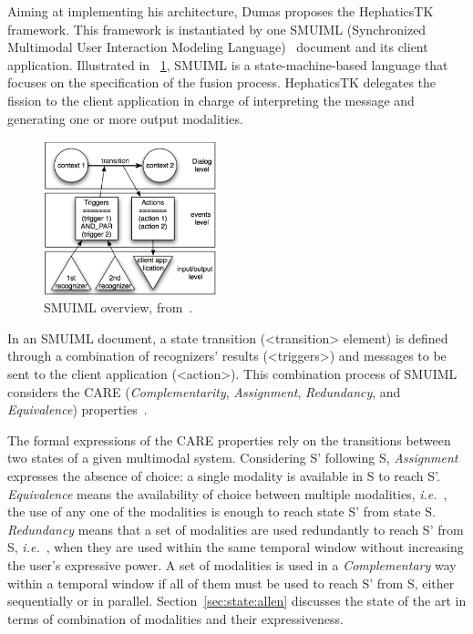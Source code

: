 \documentclass[
  doutorado,
  american
]{ThesisPUC}
\newcommand{\fig}[1]{\figurename~\ref{#1}}
\newcommand{\sect}[1]{Section~\ref{#1}}
\newcommand{\captionvspace}{\vspace{-1.3em}}
\begin{document}
Aiming at implementing his architecture, Dumas proposes the HephaticsTK 
framework. This framework is instantiated by one SMUIML (Synchronized 
Multimodal User Interaction Modeling Language)~\cite{dumas_description_2010} document and its client 
application. Illustrated in \fig{fig:smuiml}, SMUIML is a state-machine-based 
language 
that focuses on the specification of the fusion process. HephaticsTK delegates 
the fission to the client application in charge of interpreting the message and 
generating one or more output modalities. 

\begin{figure}[!ht]
\begin{center}
	\includegraphics[width=5cm, keepaspectratio]{img/img8.png}
	\caption[SMUIML overview]{SMUIML overview, from~\cite{dumas_prototyping_2008}.}
	\label{fig:smuiml}
    \captionvspace
\end{center}
\end{figure}

In an SMUIML document, a state transition (<transition> element) is defined
through a combination of recognizers’ results (<triggers>) and messages to be
sent to the client application (<action>). This combination process of SMUIML
considers the CARE (\textit{Complementarity}, \textit{Assignment}, 
\textit{Redundancy}, and \textit{Equivalence}) properties~\cite{coutaz_four_1995}. 

The formal expressions of the CARE properties rely on the transitions between
two states of a given multimodal system. Considering S’ following S, 
\textit{Assignment} expresses the absence of choice: a single modality is
available in S to reach S’. \textit{Equivalence} means the availability of
choice between multiple modalities, \textit{i.e.}~, the use of any one of the modalities is
enough to reach state S’ from state S. \textit{Redundancy} means that a set of
modalities are used redundantly to reach S’ from S, \textit{i.e.}~, when they are used
within the same temporal window without increasing the user’s expressive power.
A set of modalities is used in a \textit{Complementary} way within a temporal
window if all of them must be used to reach S’ from S, either sequentially or in
parallel. \sect{sec:state:allen} discusses the state of the art in 
terms of combination of modalities and their expressiveness. 
\end{document}

